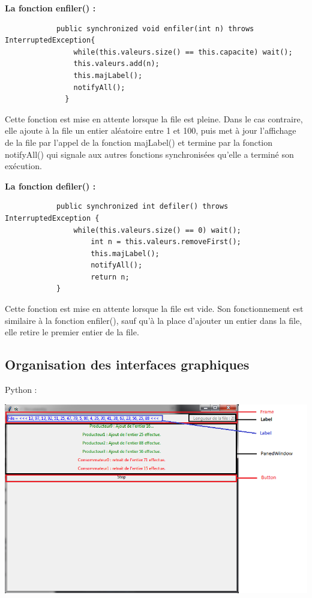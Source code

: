 \documentclass{article}
\begin{document}
    \textbf{La fonction enfiler() : }
        \begin{verbatim}
            public synchronized void enfiler(int n) throws InterruptedException{
                while(this.valeurs.size() == this.capacite) wait();
                this.valeurs.add(n);
                this.majLabel();
                notifyAll();
              }
        \end{verbatim}

        Cette fonction est mise en attente lorsque la file est pleine. Dans le cas contraire, elle ajoute à la file un entier aléatoire entre 1 et 100, puis met à jour l'affichage de la file par l'appel de la fonction majLabel() et termine par la fonction notifyAll() qui signale aux autres fonctions synchronisées qu'elle a terminé son exécution.
        \bigskip

    \textbf{La fonction defiler() : }
        \begin{verbatim}
            public synchronized int defiler() throws  InterruptedException {
                while(this.valeurs.size() == 0) wait();
                    int n = this.valeurs.removeFirst();
                    this.majLabel();
                    notifyAll();
                    return n;
            }
        \end{verbatim}

        Cette fonction est mise en attente lorsque la file est vide. Son fonctionnement est similaire à la fonction enfiler(), sauf qu'à la place d'ajouter un entier dans la file, elle retire le premier entier de la file.
        \bigskip

\cleardoublepage

\subsection{Organisation des interfaces graphiques}
Python :
\begin{center}
  \includegraphics[scale=0.8]{zonesPython.PNG}
\end{center}
\end{document}

